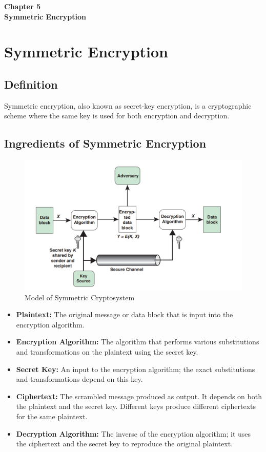 \clearpage
\thispagestyle{empty} 
\begin{center}
    \vspace*{\fill} 
    \Huge \textbf{Chapter 5} \\
    \Huge \textbf{Symmetric Encryption} 
    \vspace*{\fill}
\end{center}
\clearpage
\chapter{Symmetric Encryption}

\section{Definition}
Symmetric encryption, also known as secret-key encryption, is a cryptographic scheme where the same key is used for both encryption and decryption.

\section{Ingredients of Symmetric Encryption}
\begin{figure}
    \centering
    \includegraphics[width=1\linewidth]{Data_Privacy_and_Cryptography/Figures/model of symmetric crypto.jpeg}
    \caption{Model of Symmetric Cryptosystem}
    \label{fig:enter-label}
\end{figure}
\begin{itemize}
    \item \textbf{Plaintext:} The original message or data block that is input into the encryption algorithm.
    \item \textbf{Encryption Algorithm:} The algorithm that performs various substitutions and transformations on the plaintext using the secret key.
    \item \textbf{Secret Key:} An input to the encryption algorithm; the exact substitutions and transformations depend on this key.
    \item \textbf{Ciphertext:} The scrambled message produced as output. It depends on both the plaintext and the secret key. Different keys produce different ciphertexts for the same plaintext.
    \item \textbf{Decryption Algorithm:} The inverse of the encryption algorithm; it uses the ciphertext and the secret key to reproduce the original plaintext.
\end{itemize}

